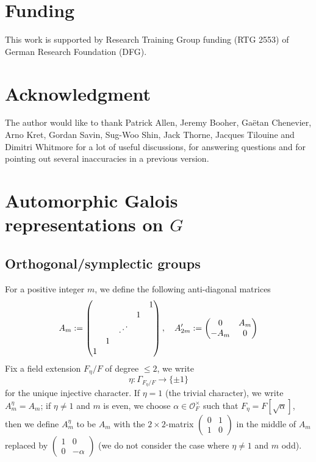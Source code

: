 \documentclass[12pt,oneside,reqno]{amsart}
\theoremstyle{plain}
\begin{document}
	
	
	\section*{Funding}
	This work is supported by Research Training Group funding (RTG 2553) of German Research Foundation (DFG).
	
	
	\section*{Acknowledgment}
	The author would like to thank Patrick Allen, Jeremy Booher, Gaëtan Chenevier, Arno Kret, Gordan Savin, Sug-Woo Shin, Jack Thorne, Jacques Tilouine and Dimitri Whitmore for a lot of useful discussions, for answering questions and for pointing out several inaccuracies in a previous version.
	
	
	
	
	
	
	
	
	
	
	
	
	
	
	
	
	\section{Automorphic Galois representations on $G$}\label{Special orthogonal groups and automorphic Galois representations}
	
	
	
	\subsection{Orthogonal/symplectic groups}
	For a positive integer $m$, we define the following anti-diagonal matrices
	\[
	A_m
	:=
	\begin{pmatrix}
		& & & & 1 \\
		& & & 1 & \\
		& & \iddots & & \\
		& 1 & & & \\
		1 & & & &
	\end{pmatrix},
	\quad
	A_{2m}'
	:=
	\begin{pmatrix}
		0 & A_m \\ -A_m & 0
	\end{pmatrix}
	\index{A@$A_m,A_{2m}'$}
	\]
	Fix a field extension $F_{\eta}/F$ of degree $\leq2$, we write
	\[
	\eta\colon\Gamma_{F_\eta/F}\to\{\pm1\}
	\]
	for the unique injective character. If $\eta=1$ (the trivial character), we write $A_m^\eta=A_m$; if $\eta\neq1$ and $m$ is even, we choose $\alpha\in\mathcal{O}_F^\times$ such that $F_\eta=F[\sqrt{\alpha}]$, then we define $A_m^\eta$ to be $A_m$ with the $2\times2$-matrix $\begin{pmatrix}
		0 & 1 \\ 1 & 0
	\end{pmatrix}$ in the middle of $A_m$ replaced by $\begin{pmatrix}
		1 & 0 \\ 0 & -\alpha
	\end{pmatrix}$ (we do not consider the case where $\eta\neq1$ and $m$ odd).
	
\end{document}

